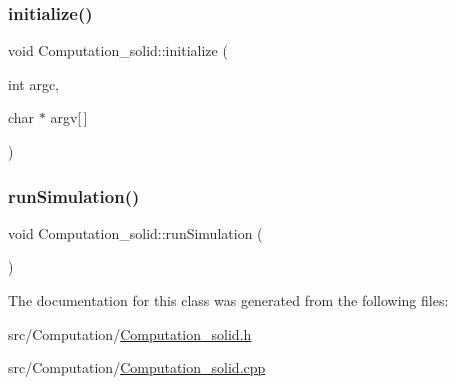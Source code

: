 \subsubsection{\texorpdfstring{initialize()}{initialize()}}
{\footnotesize\ttfamily void Computation\+\_\+solid\+::initialize (\begin{DoxyParamCaption}\item[{int}]{argc,  }\item[{char $\ast$}]{argv\mbox{[}$\,$\mbox{]} }\end{DoxyParamCaption})}

\mbox{\label{classComputation__solid_a5460ead715cf41883b0abd060e348e12}} 
\subsubsection{\texorpdfstring{runSimulation()}{runSimulation()}}
{\footnotesize\ttfamily void Computation\+\_\+solid\+::run\+Simulation (\begin{DoxyParamCaption}{ }\end{DoxyParamCaption})}



The documentation for this class was generated from the following files\+:\begin{DoxyCompactItemize}
\item 
src/\+Computation/\mbox{\hyperlink{Computation__solid_8h}{Computation\+\_\+solid.\+h}}\item 
src/\+Computation/\mbox{\hyperlink{Computation__solid_8cpp}{Computation\+\_\+solid.\+cpp}}\end{DoxyCompactItemize}
